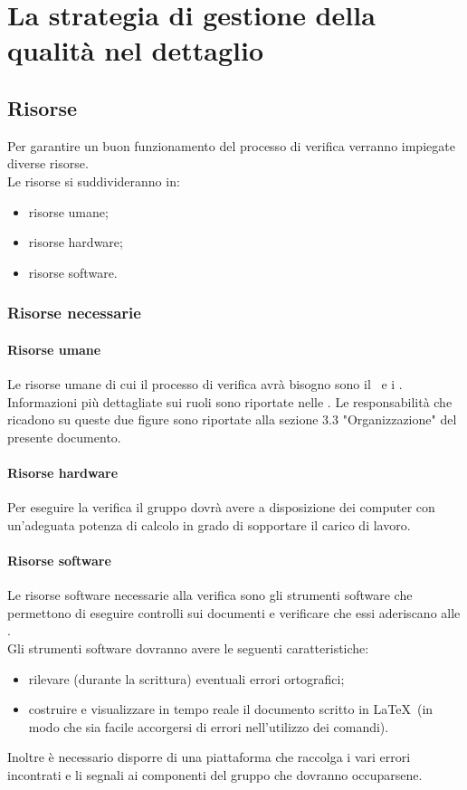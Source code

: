 \documentclass[../PianoDiQualifica.tex]{subfiles}
\begin{document}
\section{La strategia di gestione della qualità nel dettaglio}
		\subsection{Risorse}
		Per garantire un buon funzionamento del processo di verifica verranno impiegate diverse risorse.\\
		Le risorse si suddivideranno in:
		\begin{itemize}
			\item risorse umane;
			\item risorse hardware;
			\item risorse software.
		\end{itemize}
			\subsubsection{Risorse necessarie}
				\paragraph{Risorse umane}
				Le risorse umane di cui il processo di verifica avrà bisogno sono il \responsabilediprogetto\ e i \verificatori.
				Informazioni più dettagliate sui ruoli sono riportate nelle \normediprogettov. Le responsabilità che ricadono su queste due figure sono riportate alla sezione 3.3 "Organizzazione" del presente documento.
				\paragraph{Risorse hardware}
				Per eseguire la verifica il gruppo dovrà avere a disposizione dei computer con un'adeguata potenza di calcolo in grado di sopportare il carico di lavoro.		    
				\paragraph{Risorse software}
			    Le risorse software necessarie alla verifica sono gli strumenti software che permettono di eseguire controlli sui documenti e verificare che essi aderiscano alle \normediprogettov.\\
			    Gli strumenti software dovranno avere le seguenti caratteristiche:
			    \begin{itemize}
			    	\item rilevare (durante la scrittura) eventuali errori ortografici;
			    	\item costruire e visualizzare in tempo reale il documento scritto in \LaTeX\ (in modo che sia facile accorgersi di errori nell'utilizzo dei comandi).
			    \end{itemize}
			    Inoltre è necessario disporre di una piattaforma che raccolga i vari errori incontrati e li segnali ai componenti del gruppo che dovranno occuparsene. 
\end{document}
